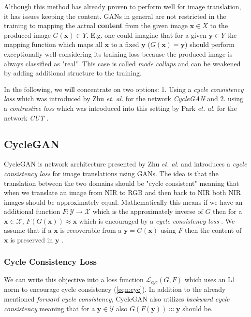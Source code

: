 \documentclass[a4paper,11pt, DIV=12]{scrartcl}
\newcommand{\x}{\boldsymbol{x}}
\newcommand{\y}{\boldsymbol{y}}
\begin{document}
Although this method has already proven to perform well for image translation, %
it has issues keeping the content. GANs in general are not restricted in the training to mapping the actual \textbf{content} from the given image
$\x \in X$ to the produced image $G(\x) \in Y$.
E.g. one could imagine that for a given $\y \in Y$ the mapping function which maps all $\x$ to a fixed $\y$ ($G(\x) = \y$)
should perform exceptionally well considering its training loss because the produced image is always classified as "real".
This case is called \textit{mode collaps} and can be weakened by adding additional structure to the training.

In the following, we will concentrate on two options:
1. Using a \textit{cycle consistency loss} which was introduced by Zhu \textit{et. al.} for the network \textit{CycleGAN} \cite{cyclegan_orig}
and 2. using a \textit{contrastive loss} which was introduced into this setting by Park \textit{et. al.} for the network \textit{CUT} \cite{cut}.

\subsection{CycleGAN}
CycleGAN is network architecture presented by Zhu \textit{et. al.} and introduces a \textit{cycle consistency loss} for image translations using GANs.
The idea is that the translation between the two domains should be "cycle consistent" meaning that when we translate an image from NIR to RGB and then back
to NIR both NIR images should be approximately equal.
Mathematically this means if we have an additional function $F: \mathcal{Y} \to \mathcal{X}$ which is the approximately inverse of $G$ then for a $\x \in \mathcal{X}$, $F(G(\x)) \approx \x$
which is encouraged by a \textit{cycle consistency loss} \cite{cyclegan_orig}. We assume that if a $\x$ is recoverable from a $\y = G(\x)$ using $F$ then the content of $\x$
is preserved in $\y$ \cite{cyclegan_orig}.

\subsubsection*{Cycle Consistency Loss}
We can write this objective into a loss function $\mathcal{L}_{cyc}(G, F)$ which uses an L1 norm to encourage cycle consistency (\autoref{eqn:cyc}).
In addition to the already mentioned \textit{forward cycle consistency}, CycleGAN also utilizes \textit{backward cycle consistency} meaning that for a $\y \in \mathcal{Y}$
also $G(F(\y)) \approx \y$ \cite{cyclegan_orig} should be.
\end{document}
